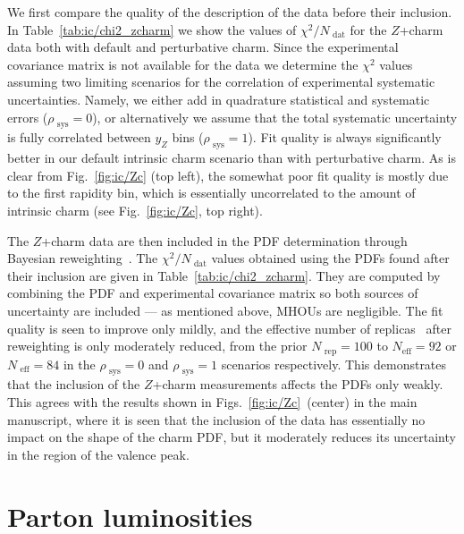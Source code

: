 We first compare the quality of the description of the \lhcb data
before their inclusion. In Table~\ref{tab:ic/chi2_zcharm} we show the
values of $\chi^2/N_\textrm{ dat}$ for the \lhcb $Z$+charm data
both with default and perturbative charm.
%
Since the experimental covariance matrix is not available for the \lhcb
data we determine the $\chi^2$ values assuming two limiting scenarios
for the correlation of experimental systematic uncertainties.
%
Namely, 
we either add in quadrature statistical and systematic errors ($\rho_\textrm{ sys}=0$),
or alternatively we assume that the total systematic uncertainty
is fully correlated between $y_Z$ bins ($\rho_\textrm{ sys}=1$). Fit
quality is always significantly better in our default intrinsic charm
scenario than with perturbative charm.
%
As is clear from
Fig.~\ref{fig:ic/Zc} (top left), the somewhat poor fit quality is mostly due to the first
rapidity bin, which is essentially uncorrelated to the amount of
intrinsic charm (see
Fig.~\ref{fig:ic/Zc}, top right).

The \lhcb $Z$+charm data are then included in the PDF determination
through
Bayesian reweighting~\cite{Ball:2010gb,Ball:2011gg}. The
$\chi^2/N_\textrm{ dat}$ values obtained using the PDFs found after their
inclusion are given in
Table~\ref{tab:ic/chi2_zcharm}.
%
They are computed by combining the PDF and
experimental covariance matrix so both sources of uncertainty are
included --- as mentioned above, MHOUs are negligible.
The fit quality is seen to improve only
mildly, and the effective number of
replicas~\cite{Ball:2010gb,Ball:2011gg} after reweighting
is only moderately reduced, from the prior $N_\textrm{ rep}=100$ to $N_\textrm{
eff}=92$ or $N_\textrm{ eff}=84$ in the
$\rho_\textrm{ sys}=0$ and $\rho_\textrm{ sys}=1$ scenarios respectively.
%
This
demonstrates that the inclusion of the \lhcb $Z$+charm measurements  affects
the PDFs only weakly. This agrees with the results shown in 
Figs.~\ref{fig:ic/Zc}~(center) in
the main manuscript, where it is seen that the inclusion of the \lhcb
data has essentially no impact on the shape of the charm PDF, but
it moderately reduces its uncertainty in the region of the valence peak.



\section{Parton luminosities}
\label{sec:ic/lumis}

